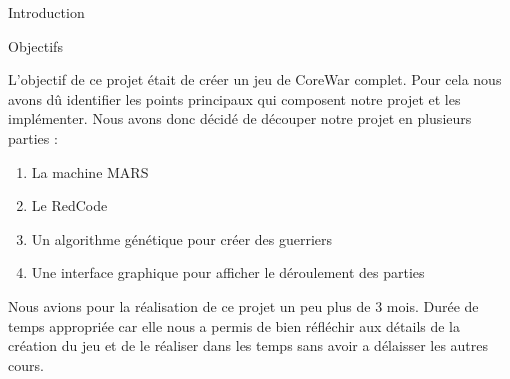 \documentclass[a4paper, 10pt]{article}
\begin{document}
\begin{section}{Introduction}
        \begin{subsection}{Objectifs}
            \par
                L'objectif de ce projet était de créer un jeu de CoreWar complet. Pour cela nous avons dû identifier les points principaux qui composent notre projet et les implémenter. Nous avons donc décidé de découper notre projet en plusieurs parties :
                \smallskip
                \begin{enumerate}
                    \item La machine MARS
                    \item Le RedCode
                    \item Un algorithme génétique pour créer des guerriers
                    \item Une interface graphique pour afficher le déroulement des parties
                \end{enumerate}
                \medskip
                Nous avions pour la réalisation de ce projet un peu plus de 3 mois. Durée de temps appropriée car elle nous a permis de bien réfléchir aux détails de la création du jeu et de le réaliser dans les temps sans avoir a délaisser les autres cours.
                \bigskip
        \end{subsection}
    \end{section}
    
\end{document}
